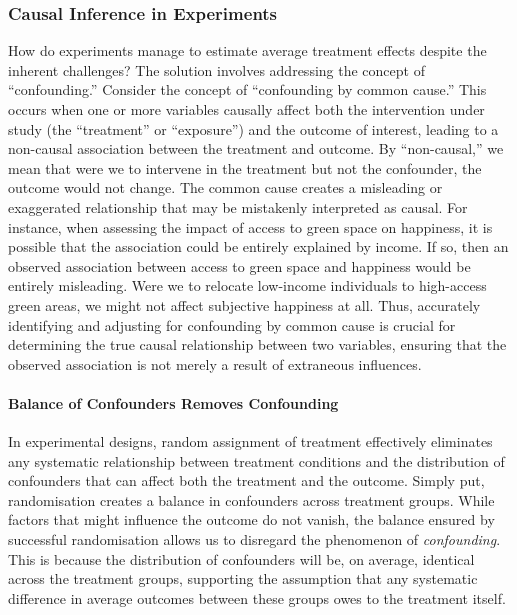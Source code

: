 \documentclass[
  singlecolumn]{article}
\let\oldparagraph\paragraph
\renewcommand{\paragraph}[1]{\oldparagraph{#1}\mbox{}}
\begin{document}
\subsubsection{Causal Inference in
Experiments}\label{causal-inference-in-experiments}

How do experiments manage to estimate average treatment effects despite
the inherent challenges? The solution involves addressing the concept of
``confounding.'' Consider the concept of ``confounding by common
cause.'' This occurs when one or more variables causally affect both the
intervention under study (the ``treatment'' or ``exposure'') and the
outcome of interest, leading to a non-causal association between the
treatment and outcome. By ``non-causal,'' we mean that were we to
intervene in the treatment but not the confounder, the outcome would not
change. The common cause creates a misleading or exaggerated
relationship that may be mistakenly interpreted as causal. For instance,
when assessing the impact of access to green space on happiness, it is
possible that the association could be entirely explained by income. If
so, then an observed association between access to green space and
happiness would be entirely misleading. Were we to relocate low-income
individuals to high-access green areas, we might not affect subjective
happiness at all. Thus, accurately identifying and adjusting for
confounding by common cause is crucial for determining the true causal
relationship between two variables, ensuring that the observed
association is not merely a result of extraneous influences.

\paragraph{Balance of Confounders Removes
Confounding}\label{balance-of-confounders-removes-confounding}

In experimental designs, random assignment of treatment effectively
eliminates any systematic relationship between treatment conditions and
the distribution of confounders that can affect both the treatment and
the outcome. Simply put, randomisation creates a balance in confounders
across treatment groups. While factors that might influence the outcome
do not vanish, the balance ensured by successful randomisation allows us
to disregard the phenomenon of \emph{confounding}. This is because the
distribution of confounders will be, on average, identical across the
treatment groups, supporting the assumption that any systematic
difference in average outcomes between these groups owes to the
treatment itself.
\end{document}
